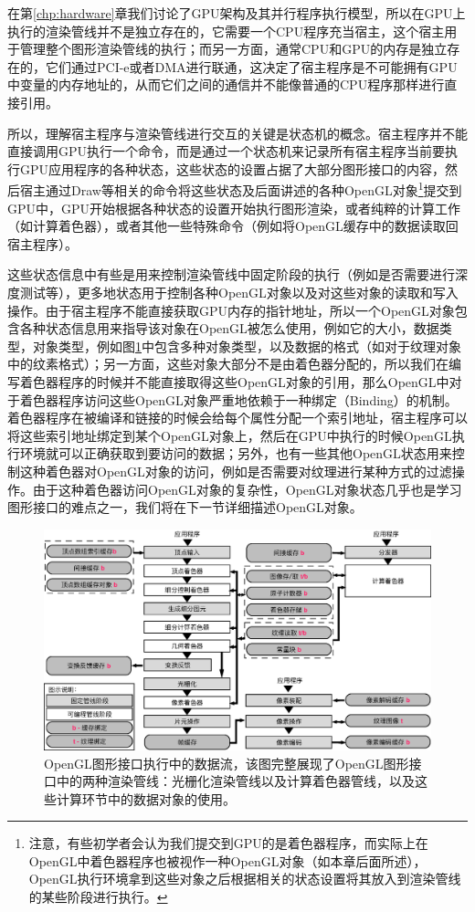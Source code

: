 在第\ref{chp:hardware}章我们讨论了GPU架构及其并行程序执行模型，所以在GPU上执行的渲染管线并不是独立存在的，它需要一个CPU程序充当宿主，这个宿主用于管理整个图形渲染管线的执行；而另一方面，通常CPU和GPU的内存是独立存在的，它们通过PCI-e或者DMA进行联通，这决定了宿主程序是不可能拥有GPU中变量的内存地址的，从而它们之间的通信并不能像普通的CPU程序那样进行直接引用。

所以，理解宿主程序与渲染管线进行交互的关键是状态机的概念。宿主程序并不能直接调用GPU执行一个命令，而是通过一个状态机来记录所有宿主程序当前要执行GPU应用程序的各种状态，这些状态的设置占据了大部分图形接口的内容，然后宿主通过Draw等相关的命令将这些状态及后面讲述的各种OpenGL对象\footnote{注意，有些初学者会认为我们提交到GPU的是着色器程序，而实际上在OpenGL中着色器程序也被视作一种OpenGL对象（如本章后面所述），OpenGL执行环境拿到这些对象之后根据相关的状态设置将其放入到渲染管线的某些阶段进行执行。}提交到GPU中，GPU开始根据各种状态的设置开始执行图形渲染，或者纯粹的计算工作（如计算着色器），或者其他一些特殊命令（例如将OpenGL缓存中的数据读取回宿主程序）。

这些状态信息中有些是用来控制渲染管线中固定阶段的执行（例如是否需要进行深度测试等），更多地状态用于控制各种OpenGL对象以及对这些对象的读取和写入操作。由于宿主程序不能直接获取GPU内存的指针地址，所以一个OpenGL对象包含各种状态信息用来指导该对象在OpenGL被怎么使用，例如它的大小，数据类型，对象类型，例如图\ref{f:api-pipeline}中包含多种对象类型，以及数据的格式（如对于纹理对象中的纹素格式）；另一方面，这些对象大部分不是由着色器分配的，所以我们在编写着色器程序的时候并不能直接取得这些OpenGL对象的引用，那么OpenGL中对于着色器程序访问这些OpenGL对象严重地依赖于一种绑定（Binding）的机制。着色器程序在被编译和链接的时候会给每个属性分配一个索引地址，宿主程序可以将这些索引地址绑定到某个OpenGL对象上，然后在GPU中执行的时候OpenGL执行环境就可以正确获取到要访问的数据；另外，也有一些其他OpenGL状态用来控制这种着色器对OpenGL对象的访问，例如是否需要对纹理进行某种方式的过滤操作。由于这种着色器访问OpenGL对象的复杂性，OpenGL对象状态几乎也是学习图形接口的难点之一，我们将在下一节详细描述OpenGL对象。

\begin{figure}
\begin{fullwidth}
	\includegraphics[width=\thewidth]{figures/api/pipeline}
	\caption{OpenGL图形接口执行中的数据流，该图完整展现了OpenGL图形接口中的两种渲染管线：光栅化渲染管线以及计算着色器管线，以及这些计算环节中的数据对象的使用。}
	\label{f:api-pipeline}
\end{fullwidth}
\end{figure}

